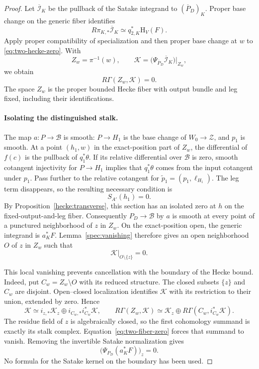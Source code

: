 \begin{proof}
Let $\overline{\mathcal I}_K$ be the pullback of the Satake
integrand to $(\overline P_D)_K$. Proper base change on the
generic fiber identifies
\[
 R\pi_{K,*}\overline{\mathcal I}_K
       \simeq q_{2,K}^*\mathrm H_V(F).
\]
Apply proper compatibility of specialization and then proper
base change at $w$ to \eqref{eq:two-hecke-zero}. With
\[
 Z_w=\pi^{-1}(w),\qquad
 \mathcal K=
   \bigl(\Psi_{\overline P_D}\overline{\mathcal I}_K\bigr)|_{Z_w},
\]
we obtain
\begin{equation}
 \label{eq:two-fiber-zero}
 R\Gamma(Z_w,\mathcal K)=0.
\end{equation}
The space $Z_w$ is the proper bounded Hecke fiber with output
bundle and leg fixed, including their identifications.

\paragraph{Isolating the distinguished stalk.}
The map $a:P\to\mathcal B$ is smooth: $P\to H_1$ is the base
change of $W_0\to\mathcal Z$, and $p_1$ is smooth.
At a point $(h_1,w)$ in the exact-position part of $Z_w$, the
differential of $f(c)$ is the pullback of $q_1^*\theta$.
If its relative differential over $\mathcal B$ is zero, smooth
cotangent injectivity for $P\to H_1$ implies that
$q_1^*\theta$ comes from the input cotangent under $p_1$.
Pass further to the relative cotangent for
$\widetilde p_1=(p_1,\ell_{H_1})$. The leg term disappears,
so the resulting necessary condition is
\[
 S_{A'}(h_1)=0.
\]
By Proposition~\ref{hecke:transverse}, this section has an isolated
zero at $h$ on the fixed-output-and-leg fiber. Consequently
$P_D\to\mathcal B$ by $a$ is smooth at every point of a punctured
neighborhood of $z$ in $Z_w$.
On the exact-position open, the generic integrand is $a_K^*F$.
Lemma~\ref{spec:vanishing} therefore gives an open neighborhood
$O$ of $z$ in $Z_w$ such that
\[
 \mathcal K|_{O\setminus\{z\}}=0.
\]

This local vanishing prevents cancellation with the boundary of
the Hecke bound. Indeed, put $C_w=Z_w\setminus O$ with its reduced
structure. The closed subsets $\{z\}$ and $C_w$ are disjoint.
Open--closed localization identifies $\mathcal K$ with its
restriction to their union, extended by zero. Hence
\[
 \mathcal K\simeq
   i_{z,*}\mathcal K_z\oplus i_{C_w,*}i_{C_w}^*\mathcal K,
 \qquad
 R\Gamma(Z_w,\mathcal K)\simeq
   \mathcal K_z\oplus R\Gamma(C_w,i_{C_w}^*\mathcal K).
\]
The residue field of $z$ is algebraically closed, so the first
cohomology summand is exactly its stalk complex.
Equation~\eqref{eq:two-fiber-zero} forces that summand to vanish.
Removing the invertible Satake normalization gives
\begin{equation}
 \label{eq:two-isolated-zero}
 \bigl(\Psi_{P_D}(a_K^*F)\bigr)_z=0.
\end{equation}
No formula for the Satake kernel on the boundary has been used.


\end{proof}

